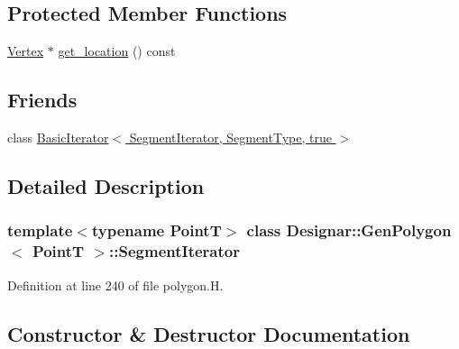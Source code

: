 \subsection*{Protected Member Functions}
\begin{DoxyCompactItemize}
\item 
\hyperlink{class_designar_1_1_d_l_node}{Vertex} $\ast$ \hyperlink{class_designar_1_1_gen_polygon_1_1_segment_iterator_aa9bf75b7e9feef819ad97f7acd152fe6}{get\+\_\+location} () const
\end{DoxyCompactItemize}
\subsection*{Friends}
\begin{DoxyCompactItemize}
\item 
class \hyperlink{class_designar_1_1_gen_polygon_1_1_segment_iterator_a54b9d6098f6dc7d5411a81dccef33d89}{Basic\+Iterator$<$ Segment\+Iterator, Segment\+Type, true $>$}
\end{DoxyCompactItemize}


\subsection{Detailed Description}
\subsubsection*{template$<$typename PointT$>$\newline
class Designar\+::\+Gen\+Polygon$<$ Point\+T $>$\+::\+Segment\+Iterator}



Definition at line 240 of file polygon.\+H.



\subsection{Constructor \& Destructor Documentation}
\mbox{\label{class_designar_1_1_gen_polygon_1_1_segment_iterator_a80756e8c1b97f3f92ec2096de23ffbc8}} 
